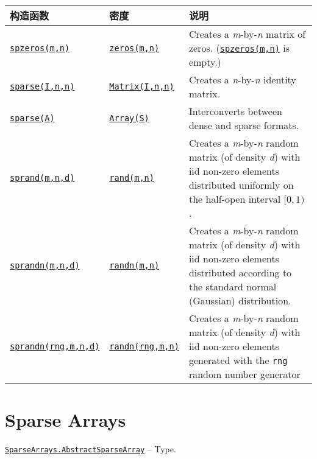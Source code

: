 \begin{table}[h]

\begin{tabulary}{\linewidth}{|L|L|L|}
\hline
构造函数 & 密度 & 说明 \\
\hline
\hyperlink{10306793690101482847}{\texttt{spzeros(m,n)}} & \hyperlink{13837674686090348619}{\texttt{zeros(m,n)}} & Creates a \emph{m}-by-\emph{n} matrix of zeros. (\hyperlink{10306793690101482847}{\texttt{spzeros(m,n)}} is empty.) \\
\hline
\hyperlink{10167157011990389788}{\texttt{sparse(I,n,n)}} & \hyperlink{5448927444601277512}{\texttt{Matrix(I,n,n)}} & Creates a \emph{n}-by-\emph{n} identity matrix. \\
\hline
\hyperlink{10167157011990389788}{\texttt{sparse(A)}} & \hyperlink{15492651498431872487}{\texttt{Array(S)}} & Interconverts between dense and sparse formats. \\
\hline
\hyperlink{10437881912081266792}{\texttt{sprand(m,n,d)}} & \hyperlink{7668863842145012694}{\texttt{rand(m,n)}} & Creates a \emph{m}-by-\emph{n} random matrix (of density \emph{d}) with iid non-zero elements distributed uniformly on the half-open interval  \([0, 1)\) . \\
\hline
\hyperlink{3588082437273281277}{\texttt{sprandn(m,n,d)}} & \hyperlink{7347069443766288058}{\texttt{randn(m,n)}} & Creates a \emph{m}-by-\emph{n} random matrix (of density \emph{d}) with iid non-zero elements distributed according to the standard normal (Gaussian) distribution. \\
\hline
\hyperlink{3588082437273281277}{\texttt{sprandn(rng,m,n,d)}} & \hyperlink{7347069443766288058}{\texttt{randn(rng,m,n)}} & Creates a \emph{m}-by-\emph{n} random matrix (of density \emph{d}) with iid non-zero elements generated with the \texttt{rng} random number generator \\
\hline
\end{tabulary}

\end{table}



\hypertarget{2402954669804328212}{}


\chapter{Sparse Arrays}


\hypertarget{428748181300158251}{}
\hyperlink{428748181300158251}{\texttt{SparseArrays.AbstractSparseArray}}  -- {Type.}

